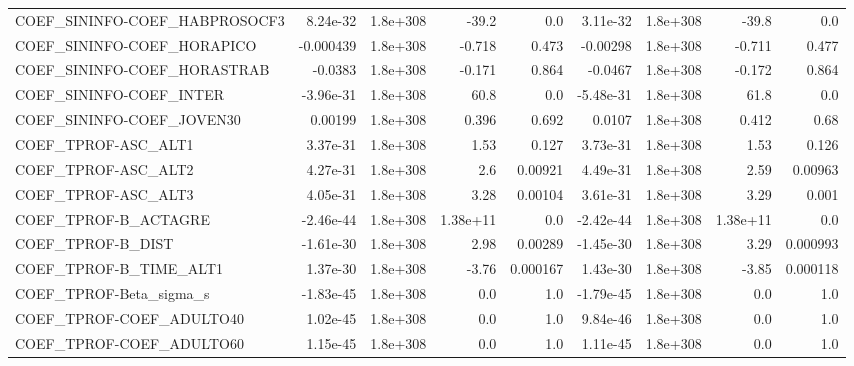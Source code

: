 \begin{tabular}{lrrrrrrrr}
COEF\_SININFO-COEF\_HABPROSOCF3     &    8.24e-32 &     1.8e+308 &     -39.2 &      0.0 &   3.11e-32 &    1.8e+308 &        -39.8 &           0.0 \\
COEF\_SININFO-COEF\_HORAPICO        &   -0.000439 &     1.8e+308 &    -0.718 &    0.473 &   -0.00298 &    1.8e+308 &       -0.711 &         0.477 \\
COEF\_SININFO-COEF\_HORASTRAB       &     -0.0383 &     1.8e+308 &    -0.171 &    0.864 &    -0.0467 &    1.8e+308 &       -0.172 &         0.864 \\
COEF\_SININFO-COEF\_INTER           &   -3.96e-31 &     1.8e+308 &      60.8 &      0.0 &  -5.48e-31 &    1.8e+308 &         61.8 &           0.0 \\
COEF\_SININFO-COEF\_JOVEN30         &     0.00199 &     1.8e+308 &     0.396 &    0.692 &     0.0107 &    1.8e+308 &        0.412 &          0.68 \\
COEF\_TPROF-ASC\_ALT1               &    3.37e-31 &     1.8e+308 &      1.53 &    0.127 &   3.73e-31 &    1.8e+308 &         1.53 &         0.126 \\
COEF\_TPROF-ASC\_ALT2               &    4.27e-31 &     1.8e+308 &       2.6 &  0.00921 &   4.49e-31 &    1.8e+308 &         2.59 &       0.00963 \\
COEF\_TPROF-ASC\_ALT3               &    4.05e-31 &     1.8e+308 &      3.28 &  0.00104 &   3.61e-31 &    1.8e+308 &         3.29 &         0.001 \\
COEF\_TPROF-B\_ACTAGRE              &   -2.46e-44 &     1.8e+308 &  1.38e+11 &      0.0 &  -2.42e-44 &    1.8e+308 &     1.38e+11 &           0.0 \\
COEF\_TPROF-B\_DIST                 &   -1.61e-30 &     1.8e+308 &      2.98 &  0.00289 &  -1.45e-30 &    1.8e+308 &         3.29 &      0.000993 \\
COEF\_TPROF-B\_TIME\_ALT1            &    1.37e-30 &     1.8e+308 &     -3.76 & 0.000167 &   1.43e-30 &    1.8e+308 &        -3.85 &      0.000118 \\
COEF\_TPROF-Beta\_sigma\_s           &   -1.83e-45 &     1.8e+308 &       0.0 &      1.0 &  -1.79e-45 &    1.8e+308 &          0.0 &           1.0 \\
COEF\_TPROF-COEF\_ADULTO40          &    1.02e-45 &     1.8e+308 &       0.0 &      1.0 &   9.84e-46 &    1.8e+308 &          0.0 &           1.0 \\
COEF\_TPROF-COEF\_ADULTO60          &    1.15e-45 &     1.8e+308 &       0.0 &      1.0 &   1.11e-45 &    1.8e+308 &          0.0 &           1.0 \\

\end{tabular}
